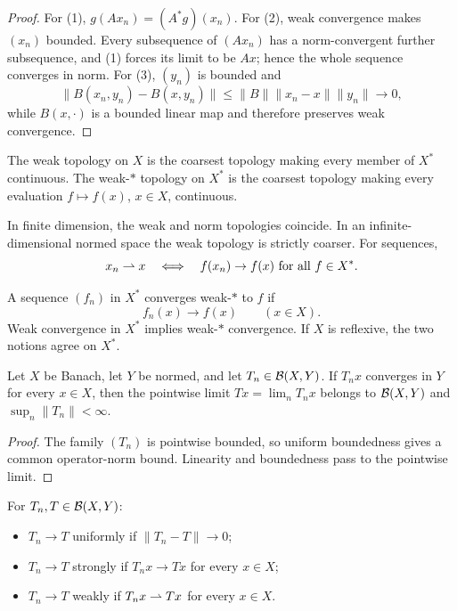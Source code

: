 \begin{proof}
For (1), $g(Ax_n)=(A^*g)(x_n)$.  For (2), weak convergence makes $(x_n)$
bounded.  Every subsequence of $(Ax_n)$ has a norm-convergent further
subsequence, and (1) forces its limit to be $Ax$; hence the whole sequence
converges in norm.  For (3), $(y_n)$ is bounded and
\[
  \|B(x_n,y_n)-B(x,y_n)\|
  \le\|B\|\|x_n-x\|\|y_n\|\to0,
\]
while $B(x,\cdot)$ is a bounded linear map and therefore preserves weak
convergence.
\end{proof}

\begin{notedefinition}
The weak topology on $X$ is the coarsest topology making every member of
$X^*$ continuous.  The weak-$*$ topology on $X^*$ is the coarsest topology
making every evaluation $f\mapsto f(x)$, $x\in X$, continuous.
\end{notedefinition}

\begin{notetheorem}
In finite dimension, the weak and norm topologies coincide.  In an
infinite-dimensional normed space the weak topology is strictly coarser.
For sequences,
\[
  x_n\rightharpoonup x
  \quad\Longleftrightarrow\quad
  f(x_n)\to f(x)\text{ for all }f\in X^*.
\]
\end{notetheorem}

\begin{notedefinition}
A sequence $(f_n)$ in $X^*$ converges weak-$*$ to $f$ if
\[
  f_n(x)\longrightarrow f(x)
  \qquad(x\in X).
\]
Weak convergence in $X^*$ implies weak-$*$ convergence.  If $X$ is reflexive,
the two notions agree on $X^*$.
\end{notedefinition}

\begin{notetheorem}
Let $X$ be Banach, let $Y$ be normed, and let
$T_n\in\mathcal{B}(X,Y)$.  If $T_nx$ converges in $Y$ for every $x\in X$, then the
pointwise limit $Tx=\lim_nT_nx$ belongs to $\mathcal{B}(X,Y)$ and
$\sup_n\|T_n\|<\infty$.
\end{notetheorem}

\begin{proof}
The family $(T_n)$ is pointwise bounded, so uniform boundedness gives a common
operator-norm bound.  Linearity and boundedness pass to the pointwise limit.
\end{proof}

\begin{notedefinition}
For $T_n,T\in\mathcal{B}(X,Y)$:
\begin{itemize}
  \item $T_n\to T$ uniformly if $\|T_n-T\|\to0$;
  \item $T_n\to T$ strongly if $T_nx\to Tx$ for every $x\in X$;
  \item $T_n\to T$ weakly if $T_nx\rightharpoonup Tx$ for every $x\in X$.
\end{itemize}
\end{notedefinition}

